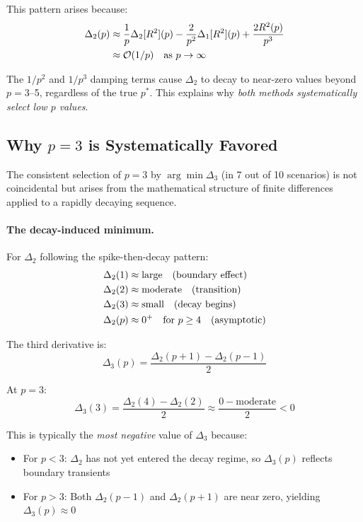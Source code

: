\documentclass[11pt,a4paper]{article}
\begin{document}
This pattern arises because:
\begin{align}
\Delta_2(p) &\approx \frac{1}{p}\Delta_2[R^2](p) - \frac{2}{p^2}\Delta_1[R^2](p) + \frac{2R^2(p)}{p^3} \notag \\
&\approx \mathcal{O}(1/p) \quad \text{as } p \to \infty
\label{eq:delta2_decay}
\end{align}

The $1/p^2$ and $1/p^3$ damping terms cause $\Delta_2$ to decay to near-zero values beyond $p = 3$--5, regardless of the true $p^*$. This explains why \emph{both methods systematically select low $p$ values}.

\subsection{Why $p = 3$ is Systematically Favored}

The consistent selection of $p = 3$ by $\arg\min \Delta_3$ (in 7 out of 10 scenarios) is not coincidental but arises from the mathematical structure of finite differences applied to a rapidly decaying sequence.

\paragraph{The decay-induced minimum.}
For $\Delta_2$ following the spike-then-decay pattern:
\begin{align}
\Delta_2(1) &\approx \text{large} \quad \text{(boundary effect)} \notag \\
\Delta_2(2) &\approx \text{moderate} \quad \text{(transition)} \notag \\
\Delta_2(3) &\approx \text{small} \quad \text{(decay begins)} \notag \\
\Delta_2(p) &\approx 0^+ \quad \text{for } p \geq 4 \quad \text{(asymptotic)}
\end{align}

The third derivative is:
\begin{equation}
\Delta_3(p) = \frac{\Delta_2(p+1) - \Delta_2(p-1)}{2}
\end{equation}

At $p = 3$:
\begin{equation}
\Delta_3(3) = \frac{\Delta_2(4) - \Delta_2(2)}{2} \approx \frac{0 - \text{moderate}}{2} < 0
\end{equation}

This is typically the \emph{most negative} value of $\Delta_3$ because:
\begin{itemize}
\item For $p < 3$: $\Delta_2$ has not yet entered the decay regime, so $\Delta_3(p)$ reflects boundary transients
\item For $p > 3$: Both $\Delta_2(p-1)$ and $\Delta_2(p+1)$ are near zero, yielding $\Delta_3(p) \approx 0$
\end{itemize}
\end{document}

